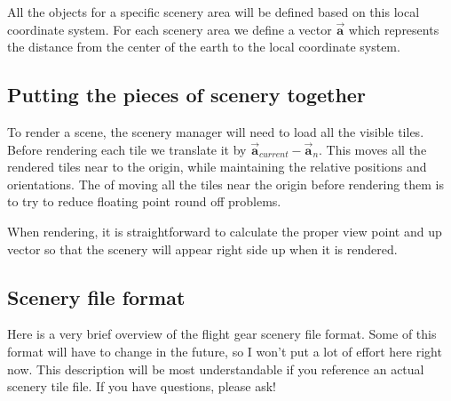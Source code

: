 \documentclass[12pt]{article}
\begin{document}
All the objects for a specific scenery area will be defined based on
this local coordinate system.  For each scenery area we define a
vector $\vec{\mathbf{a}}$ which represents the distance from the
center of the earth to the local coordinate system.


\subsection{Putting the pieces of scenery together}

To render a scene, the scenery manager will need to load all the
visible tiles.  Before rendering each tile we translate it by
$\vec{\mathbf{a}}_{current} - \vec{\mathbf{a}}_{n}$.  This moves all
the rendered tiles near to the origin, while maintaining the relative
positions and orientations.  The of moving all the tiles near the
origin before rendering them is to try to reduce floating point round
off problems.

When rendering, it is straightforward to calculate the proper view
point and up vector so that the scenery will appear right side up when
it is rendered.

\subsection{Scenery file format}

Here is a very brief overview of the flight gear scenery file format.
Some of this format will have to change in the future, so I won't put
a lot of effort here right now.  This description will be most
understandable if you reference an actual scenery tile file.  If you
have questions, please ask!
\end{document}
